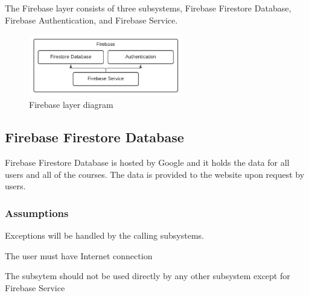 The Firebase layer consists of three subsystems, Firebase Firestore Database, Firebase Authentication, and Firebase Service.

\begin{figure}[h!]
    \centering
    \includegraphics[width=0.60\textwidth]{images/ADS_Diagram_Firebase}
    \caption{Firebase layer diagram}
\end{figure}

\subsection{Firebase Firestore Database}

Firebase Firestore Database is hosted by Google and it holds the data for all users and all of the courses.
The data is provided to the website upon request by users.

\subsubsection{Assumptions}
\begin{itemize}
    \begin{item}
          Exceptions will be handled by the calling subsystems.
    \end{item}
    \begin{item}
          The user must have Internet connection
    \end{item}
    \begin{item}
          The subsytem should not be used directly by any other subsystem except for Firebase Service
    \end{item}
\end{itemize}

